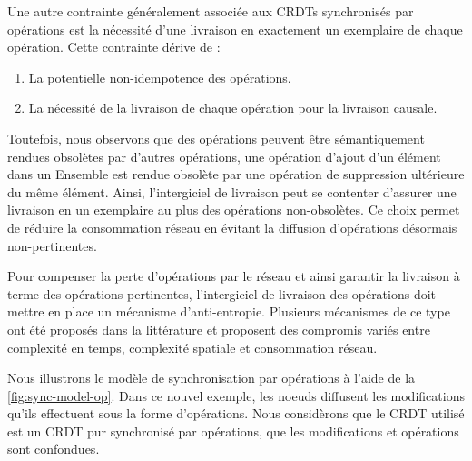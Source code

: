 Une autre contrainte généralement associée aux \acp{CRDT} synchronisés par opérations est la nécessité d'une livraison en exactement un exemplaire de chaque opération.
Cette contrainte dérive de :
\begin{enumerate}[label=(\roman*)]
  \item La potentielle non-idempotence des opérations.
  \item La nécessité de la livraison de chaque opération pour la livraison causale.
\end{enumerate}
Toutefois, nous observons que des opérations peuvent être sémantiquement rendues obsolètes par d'autres opérations, \eg une opération d'ajout d'un élément dans un Ensemble est rendue obsolète par une opération de suppression ultérieure du même élément.
Ainsi, l'intergiciel de livraison peut se contenter d'assurer une livraison en un exemplaire au plus des opérations non-obsolètes.
Ce choix permet de réduire la consommation réseau en évitant la diffusion d'opérations désormais non-pertinentes.

Pour compenser la perte d'opérations par le réseau et ainsi garantir la livraison à terme des opérations pertinentes, l'intergiciel de livraison des opérations doit mettre en place un mécanisme d'anti-entropie.
Plusieurs mécanismes de ce type ont été proposés dans la littérature \cite{1983-anti-entropy-vv, 2007-dynamo, 2015-approximate-hash-based-set-reconciliation, 2017-anti-entropy-without-merkle-trees}  et proposent des compromis variés entre complexité en temps, complexité spatiale et consommation réseau.

Nous illustrons le modèle de synchronisation par opérations à l'aide de la \autoref{fig:sync-model-op}.
Dans ce nouvel exemple, les noeuds diffusent les modifications qu'ils effectuent sous la forme d'opérations.
Nous considèrons que le \ac{CRDT} utilisé est un \ac{CRDT} pur synchronisé par opérations, \ie que les modifications et opérations sont confondues.

